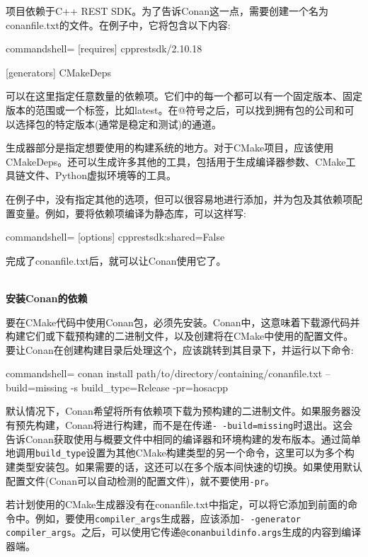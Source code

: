 项目依赖于C++ REST SDK。为了告诉Conan这一点，需要创建一个名为conanfile.txt的文件。在例子中，它将包含以下内容:

\begin{tcblisting}{commandshell={}}
[requires]
cpprestsdk/2.10.18

[generators]
CMakeDeps
\end{tcblisting}

可以在这里指定任意数量的依赖项。它们中的每一个都可以有一个固定版本、固定版本的范围或一个标签，比如latest。在@符号之后，可以找到拥有包的公司和可以选择包的特定版本(通常是稳定和测试)的通道。

生成器部分是指定想要使用的构建系统的地方。对于CMake项目，应该使用CMakeDeps。还可以生成许多其他的工具，包括用于生成编译器参数、CMake工具链文件、Python虚拟环境等的工具。

在例子中，没有指定其他的选项，但可以很容易地进行添加，并为包及其依赖项配置变量。例如，要将依赖项编译为静态库，可以这样写:

\begin{tcblisting}{commandshell={}}
[options]
cpprestsdk:shared=False
\end{tcblisting}

完成了conanfile.txt后，就可以让Conan使用它了。

\hspace*{\fill} \\ %
\noindent
\textbf{安装Conan的依赖}

要在CMake代码中使用Conan包，必须先安装。Conan中，这意味着下载源代码并构建它们或下载预构建的二进制文件，以及创建将在CMake中使用的配置文件。要让Conan在创建构建目录后处理这个，应该跳转到其目录下，并运行以下命令:

\begin{tcblisting}{commandshell={}}
conan install path/to/directory/containing/conanfile.txt --build=missing -s
build_type=Release -pr=hosacpp
\end{tcblisting}

默认情况下，Conan希望将所有依赖项下载为预构建的二进制文件。如果服务器没有预先构建，Conan将进行构建，而不是在传递\texttt{-\,-build=missing}时退出。这会告诉Conan获取使用与概要文件中相同的编译器和环境构建的发布版本。通过简单地调用\texttt{build\_type}设置为其他CMake构建类型的另一个命令，这里可以为多个构建类型安装包。如果需要的话，这还可以在多个版本间快速的切换。如果使用默认配置文件(Conan可以自动检测的配置文件)，就不要使用\texttt{-pr}。

若计划使用的CMake生成器没有在conanfile.txt中指定，可以将它添加到前面的命令中。例如，要使用\texttt{compiler\_args}生成器，应该添加\texttt{-\,-generator compiler\_args}。之后，可以使用它传递\texttt{@conanbuildinfo.args}生成的内容到编译器端。

